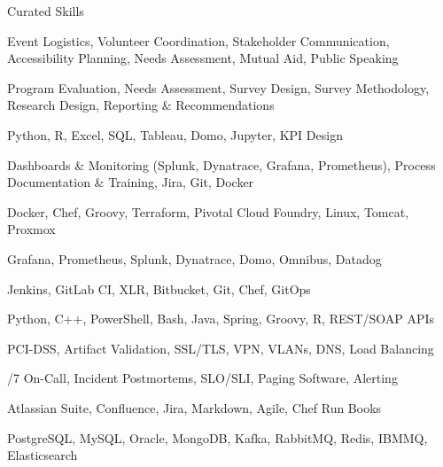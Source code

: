 
\begin{rubric}{Curated Skills}

Event Logistics, Volunteer Coordination, Stakeholder Communication, Accessibility Planning, Needs Assessment, Mutual Aid, Public Speaking

\vspace{0.3\baselineskip}
Program Evaluation, Needs Assessment, Survey Design, Survey Methodology, Research Design, Reporting \& Recommendations

\vspace{0.3\baselineskip}
Python, R, Excel, SQL, Tableau, Domo, Jupyter, KPI Design

\vspace{0.3\baselineskip}
Dashboards \& Monitoring (Splunk, Dynatrace, Grafana, Prometheus), Process Documentation \& Training, Jira, Git, Docker

\vspace{0.3\baselineskip}
Docker, Chef, Groovy, Terraform, Pivotal Cloud Foundry, Linux, Tomcat, Proxmox

\vspace{0.3\baselineskip}
Grafana, Prometheus, Splunk, Dynatrace, Domo, Omnibus, Datadog

\vspace{0.3\baselineskip}
Jenkins, GitLab CI, XLR, Bitbucket, Git, Chef, GitOps

\vspace{0.3\baselineskip}
Python, C++, PowerShell, Bash, Java, Spring, Groovy, R, REST/SOAP APIs

\vspace{0.3\baselineskip}
PCI-DSS, Artifact Validation, SSL/TLS, VPN, VLANs, DNS, Load Balancing

\vspace{0.3\baselineskip}
/7 On-Call, Incident Postmortems, SLO/SLI, Paging Software, Alerting

\vspace{0.3\baselineskip}
Atlassian Suite, Confluence, Jira, Markdown, Agile, Chef Run Books

\vspace{0.3\baselineskip}
PostgreSQL, MySQL, Oracle, MongoDB, Kafka, RabbitMQ, Redis, IBMMQ, Elasticsearch

\end{rubric}